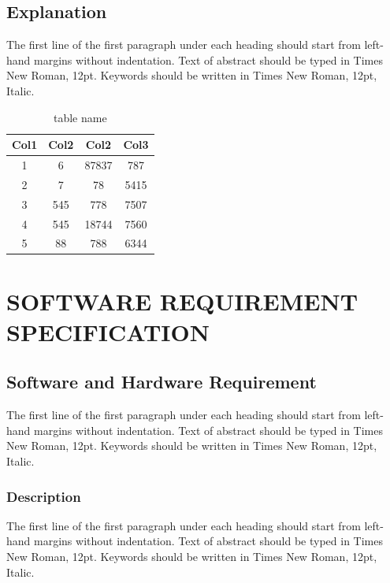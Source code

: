 \documentclass[a4paper, 12pt]{report}
\begin{document}
\section{Explanation}
\par The first line of the first paragraph under each heading should start from left-hand margins without indentation.  Text of abstract should be typed in Times New Roman, 12pt. Keywords should be written in Times New Roman, 12pt, Italic.\\
\begin{table}[h]

\begin{center}
 \begin{tabular}{||c|c|c|c||} 

 \hline
 Col1 & Col2 & Col2 & Col3 \\ [0.5ex] 
 \hline\hline
 1 & 6 & 87837 & 787 \\ 
 \hline
 2 & 7 & 78 & 5415 \\
 \hline
 3 & 545 & 778 & 7507 \\
 \hline
 4 & 545 & 18744 & 7560 \\
 \hline
 5 & 88 & 788 & 6344 \\ [1ex] 
 \hline
\end{tabular}\caption{table name}
\end{center}


\end{table}
\chapter{SOFTWARE REQUIREMENT SPECIFICATION}
\section{Software and Hardware Requirement}
\par The first line of the first paragraph under each heading should start from left-hand margins without indentation.  Text of abstract should be typed in Times New Roman, 12pt. Keywords should be written in Times New Roman, 12pt, Italic.\\

\subsection{Description}
\par The first line of the first paragraph under each heading should start from left-hand margins without indentation.  Text of abstract should be typed in Times New Roman, 12pt. Keywords should be written in Times New Roman, 12pt, Italic.\\
\end{document}
